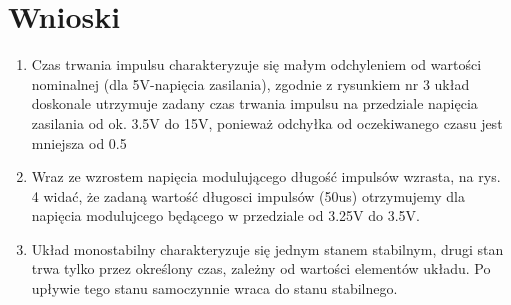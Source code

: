 \documentclass[a4paper,12pt]{article}
\begin{document}
\section {Wnioski}
\begin{enumerate}  
\item Czas trwania impulsu charakteryzuje się małym odchyleniem od wartości nominalnej (dla 5V-napięcia zasilania),
      zgodnie z rysunkiem nr 3 układ doskonale utrzymuje zadany czas trwania impulsu na przedziale
      napięcia zasilania od ok. 3.5V do 15V, ponieważ odchyłka od oczekiwanego czasu jest mniejsza od 0.5%
\item Wraz ze wzrostem napięcia modulującego długość impulsów wzrasta, na rys. 4 widać, że 
      zadaną wartość długosci impulsów (50us) otrzymujemy dla napięcia modulujcego będącego w przedziale od
      3.25V do 3.5V.
\item Układ monostabilny charakteryzuje się jednym stanem stabilnym, drugi stan trwa tylko przez określony czas, zależny od wartości elementów układu. Po upływie tego stanu samoczynnie  wraca  do  stanu  stabilnego.
\end{enumerate}
\end{document}
